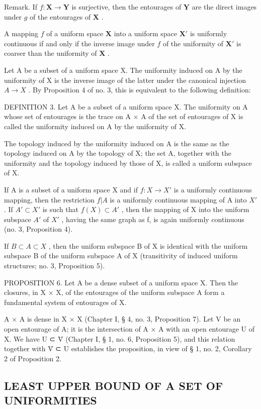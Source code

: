 Remark. If \(f: \mathbf{X} \to \mathbf{Y}\) is surjective, then the entourages of \(\mathbf{Y}\) are the direct images under \(g\) of the entourages of \(\mathbf{X}\) .

A mapping \(f\) of a uniform space \(\mathbf{X}\) into a uniform space \(\mathbf{X}'\) is uniformly continuous if and only if the inverse image under \(f\) of the uniformity of \(\mathbf{X}'\) is coarser than the uniformity of \(\mathbf{X}\) .

Let A be a subset of a uniform space X. The uniformity induced on A by the uniformity of X is the inverse image of the latter under the canonical injection \(A \rightarrow X\) . By Proposition 4 of no. 3, this is equivalent to the following definition:

DEFINITION 3. Let A be a subset of a uniform space X. The uniformity on A whose set of entourages is the trace on A × A of the set of entourages of X is called the uniformity induced on A by the uniformity of X.

The topology induced by the uniformity induced on A is the same as the topology induced on A by the topology of X; the set A, together with the uniformity and the topology induced by those of X, is called a uniform subspace of X.

If A is a subset of a uniform space X and if \(f: X \to X'\) is a uniformly continuous mapping, then the restriction \(f|A\) is a uniformly continuous mapping of A into \(X'\) . If \(A' \subset X'\) is such that \(f(X) \subset A'\) , then the mapping of X into the uniform subspace \(A'\) of \(X'\) , having the same graph as f, is again uniformly continuous (no. 3, Proposition 4).

If \(B \subset A \subset X\) , then the uniform subspace B of X is identical with the uniform subspace B of the uniform subspace A of X (transitivity of induced uniform structures; no. 3, Proposition 5).

PROPOSITION 6. Let A be a dense subset of a uniform space X. Then the closures, in X × X, of the entourages of the uniform subspace A form a fundamental system of entourages of X.

A × A is dense in X × X (Chapter I, § 4, no. 3, Proposition 7). Let V be an open entourage of A; it is the intersection of A × A with an open entourage U of X. We have U ⊂ V̄ (Chapter I, § 1, no. 6, Proposition 5), and this relation together with V̄ ⊂ U establishes the proposition, in view of § 1, no. 2, Corollary 2 of Proposition 2.

\subsection{LEAST UPPER BOUND OF A SET OF UNIFORMITIES}

